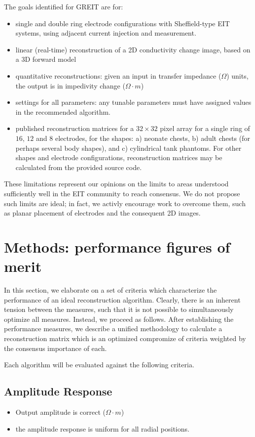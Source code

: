 \documentclass[12pt]{iopart}
\begin{document}
The goals identified for GREIT are for:
\begin{itemize}
\item
 single and double ring electrode
configurations with Sheffield-type EIT systems, using
      adjacent current injection and measurement.
\item
 linear (real-time) reconstruction of a 2D conductivity
change image, based on a 3D forward model
\item
 quantitative reconstructions:
   given an input in transfer impedance ($\Omega$) units,
                    the output is in impedivity change ($\Omega\cdot m$)
\item
 settings for all parameters:
     any tunable parameters must have assigned
     values in the recommended algorithm.
\item
 published reconstruction matrices for
      a $32\times 32$ pixel array
      for a single ring of $16$, $12$ and $8$ 
      electrodes, for the shapes:
   a) neonate chests, 
   b) adult chests (for perhaps several body shapes), and 
   c) cylindrical tank phantoms.
 For other shapes and electrode configurations,
   reconstruction matrices may be calculated from the
   provided source code.
\end{itemize}

These limitations represent our opinions on the limits
to areas understood sufficiently well in the EIT community
to reach consensus. We do not propose such limits are ideal;
in fact, we activly encourage work to overcome them,
such as planar placement of electrodes and the consequent 2D images. 

\section{Methods: performance figures of merit}
\label{sec:figmerit}

In this section, we elaborate on a set of criteria which 
characterize the performance of an ideal reconstruction
algorithm. Clearly, there is an inherent tension between
the measures, such that it is not possible to 
simultaneously optimize all measures. Instead, we proceed
as follows. After establishing the performance measures,
we describe a unified methodology to calculate a reconstruction
matrix which is an optimized compromize of criteria
weighted by the consensus importance of each.  


Each algorithm will be evaluated against the
following criteria.

\subsection{Amplitude Response}
   \begin{itemize}
   \item Output amplitude is correct ($\Omega \cdot m$)
   \item the amplitude response is uniform for all radial positions.
   \end{itemize}
\end{document}
